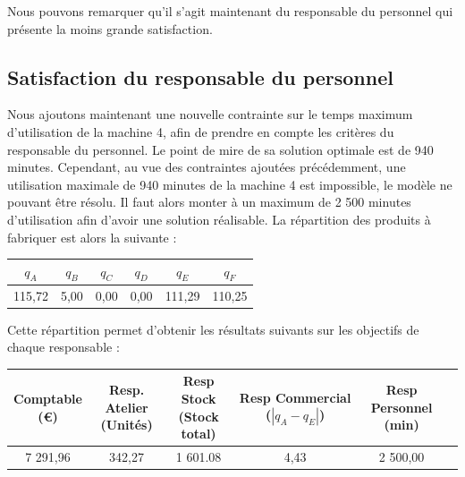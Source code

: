 \documentclass[paper=a4, fontsize=11pt]{report}
\numberwithin{equation}{section}		%
\numberwithin{figure}{section}			%
\numberwithin{table}{section}				%
\newcommand\abs[1]{\left|#1\right|}
\begin{document}
Nous pouvons remarquer qu'il s'agit maintenant du responsable du personnel qui présente la moins grande satisfaction.

\subsection{Satisfaction du responsable du personnel}

Nous ajoutons maintenant une nouvelle contrainte sur le temps maximum d'utilisation de la machine 4, afin de prendre en compte les critères du responsable du personnel. Le point de mire de sa solution optimale est de 940 minutes. Cependant, au vue des contraintes ajoutées précédemment, une utilisation maximale de 940 minutes de la machine 4 est impossible, le modèle ne pouvant être résolu. Il faut alors monter à un maximum de 2 500 minutes d'utilisation afin d'avoir une solution réalisable. La répartition des produits à fabriquer est alors la suivante :

\begin{center}
\begin{tabular}{cccccc}
\hline
$q_A$ & $q_B$ & $q_C$ & $q_D$ & $q_E$ & $q_F$ \\
\hline
115,72 & 5,00 & 0,00 & 0,00 & 111,29 & 110,25 \\
\hline
\end{tabular}
\end{center}

Cette répartition permet d'obtenir les résultats suivants sur les objectifs de chaque responsable : 

\begin{table}[H]
\begin{center}
\begin{tabular}{c|ccccc}
\shortstack{Comptable \\ \scriptsize{(€)}} & \shortstack{Resp. Atelier \\ \scriptsize (Unités)} & \shortstack{Resp Stock \\ \scriptsize (Stock total)} & \shortstack{Resp Commercial \\ \scriptsize ($\abs{q_A - q_E}$)} &   \shortstack{Resp Personnel \\ \scriptsize (min)} \\ 
\hline 
7 291,96 & 342,27 & 1 601.08 & 4,43 & 2 500,00 \\ 
\end{tabular}
\end{center}
\end{table}
\end{document}
